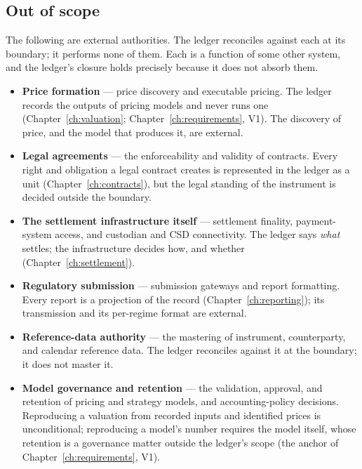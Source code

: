 \subsection{Out of scope}

The following are external authorities. The ledger reconciles against each at its boundary;
it performs none of them. Each is a function of some other system, and the ledger's
closure holds precisely because it does not absorb them.

\begin{itemize}[leftmargin=*, itemsep=2.5pt]
\item \textbf{Price formation} --- price discovery and executable pricing. The ledger
  records the outputs of pricing models and never runs one (Chapter~\ref{ch:valuation};
  Chapter~\ref{ch:requirements}, V1). The discovery of price, and the model that produces
  it, are external.
\item \textbf{Legal agreements} --- the enforceability and validity of contracts. Every
  right and obligation a legal contract creates is represented in the ledger as a unit
  (Chapter~\ref{ch:contracts}), but the legal standing of the instrument is decided
  outside the boundary.
\item \textbf{The settlement infrastructure itself} --- settlement finality, payment-system
  access, and custodian and CSD connectivity. The ledger says \emph{what} settles; the
  infrastructure decides how, and whether (Chapter~\ref{ch:settlement}).
\item \textbf{Regulatory submission} --- submission gateways and report formatting. Every
  report is a projection of the record (Chapter~\ref{ch:reporting}); its transmission and
  its per-regime format are external.
\item \textbf{Reference-data authority} --- the mastering of instrument, counterparty, and
  calendar reference data. The ledger reconciles against it at the boundary; it does not
  master it.
\item \textbf{Model governance and retention} --- the validation, approval, and retention
  of pricing and strategy models, and accounting-policy decisions. Reproducing a valuation
  from recorded inputs and identified prices is unconditional; reproducing a model's number
  requires the model itself, whose retention is a governance matter outside the ledger's
  scope (the anchor of Chapter~\ref{ch:requirements}, V1).
\end{itemize}

